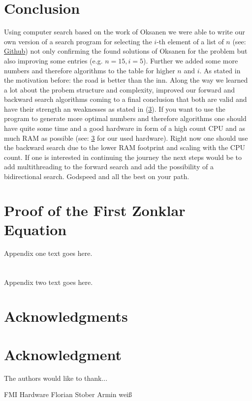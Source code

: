 \documentclass[10pt,journal,compsoc]{IEEEtran}
\begin{document}
\section{Conclusion}
Using computer search based on the work of Oksanen we were able to write our own
version of a search program for selecting the $i$-th element of a list of $n$
(see: \href{https://github.com/JGDoerrer/selection_generator}{Github}) not only
confirming the found solutions of Oksanen for the problem but also improving
some entries (e.g. $n=15, i=5$). Further we added some more numbers and
therefore algorithms to the table for higher $n$ and $i$. As stated in the
motivation before: the road is better than the inn. Along the way we learned a
lot about the probem structure and complexity, improved our forward and backward
search algorithms coming to a final conclusion that both are valid and have
their strength an weaknesses as stated in (\ref{}). If you want to use the
program to generate more optimal numbers and therefore algorithms one should
have quite some time and a good hardware in form of a high count CPU and as much
RAM as possible (see: \ref{} for our used hardware). Right now one should use
the backward search due to the lower RAM footprint and scaling with the CPU
count. If one is interested in continuing the journey the next steps would be to
add multithreading to the forward search and add the possibility of a
bidirectional search. Godspeed and all the best on your path.



\appendices
\section{Proof of the First Zonklar Equation}
Appendix one text goes here.
\section{}
Appendix two text goes here.


\ifCLASSOPTIONcompsoc
  \section*{Acknowledgments}
\else
  \section*{Acknowledgment}
\fi


The authors would like to thank...

FMI
Hardware
Florian Stober
Armin weiß

\ifCLASSOPTIONcaptionsoff
  \newpage
\fi




\end{document}
